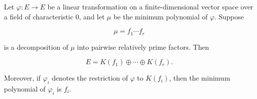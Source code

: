 Let $\varphi: E \to E$ be a linear transformation on a finite-dimensional vector space over a field of characteristic $0$, and let $\mu$ be the minimum polynomial of $\varphi$. Suppose

$$\mu = f_1 \cdots f_r$$

is a decomposition of $\mu$ into pairwise relatively prime factors. Then

$$E = K(f_1) \oplus \cdots \oplus K(f_r).$$

Moreover, if $\varphi_i$ denotes the restriction of $\varphi$ to $K(f_i)$, then the minimum polynomial of $\varphi_i$ is $f_i$.
